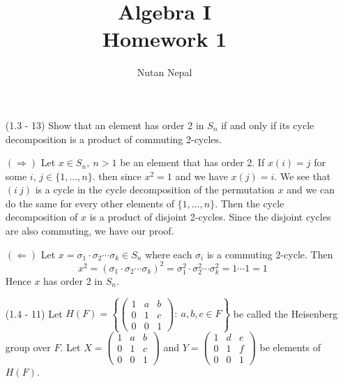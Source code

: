 \documentclass[12pt]{article}
\title{Algebra I\\
\large Homework 1
}
\author{Nutan Nepal}
\begin{document}
\maketitle
\makebox[\linewidth]{\rule{200mm}{1pt}}
\vspace{.1in}
\begin{enumerate}

\item[(1.3 - 13)] Show that an element has order 2 in 
    $S_n$ if and only if its cycle decomposition is a
    product of commuting 2-cycles.

\begin{mybox}

    $(\Longrightarrow)$
    Let $x\in S_n,\ n>1$ be an element that has order
    2. If $x(i)=j$ for some $i$, $j\in
    \{1,\ldots,n\}$. then since $x^2=1$ and we have $x(j)=i$.
    We see that $(i\ j)$ is a cycle in the cycle
    decomposition of the permutation $x$ and we can do
    the same for every other elements of $\{1,\ldots,n\}$.
    Then the cycle decomposition of $x$ is a product of
    disjoint 2-cycles. Since the disjoint cycles are also
    commuting, we have our proof.

    \vspace*{2mm}
    $(\Longleftarrow)$
    Let $x=\sigma_1\cdot\sigma_2\cdots\sigma_k \in S_n$
    where
    each $\sigma_i$ is a commuting 2-cycle. Then
    $$x^2=(\sigma_1\cdot\sigma_2\cdots\sigma_k)^2
    =\sigma_1^2\cdot\sigma_2^2\cdots\sigma_k^2
    =1\cdots 1=1$$
    Hence $x$ has order 2 in $S_n$.
\end{mybox}


\item[(1.4 - 11)] Let $H(F)=\left\{\left(\begin{array}{ccc}
    1 & a & b\\
    0 & 1 & c\\
    0 & 0 & 1 \end{array}
    \right):\ a,b,c\in F\right\}$ be called the Heisenberg
    group over $F$. Let $X=\left(\begin{array}{ccc}
        1 & a & b\\
        0 & 1 & c\\
        0 & 0 & 1 \end{array}
        \right)$
    and $Y=\left(\begin{array}{ccc}
        1 & d & e\\
        0 & 1 & f\\
        0 & 0 & 1 \end{array}
        \right)$ be elements of $H(F)$.
    \begin{enumerate}


\end{enumerate}
\end{enumerate}
\end{document}
